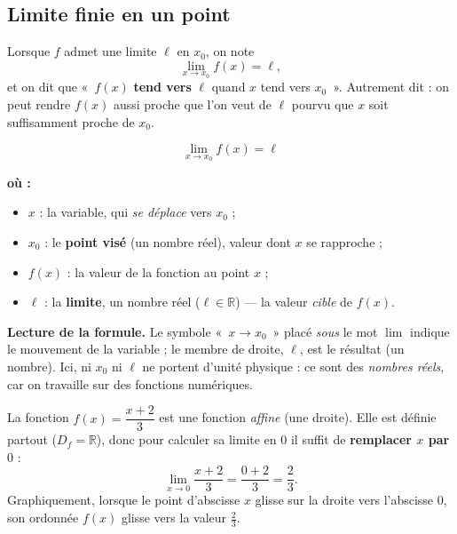\documentclass[11pt,a4paper]{article}
\newenvironment{ou}{%
  \par\smallskip\noindent\textbf{où :}\nopagebreak
  \begin{itemize}[leftmargin=1.8em,topsep=2pt,itemsep=1.5pt,parsep=0pt]}%
  {\end{itemize}}
\newcommand{\R}{\mathbb{R}}
\begin{document}
\subsection{Limite finie en un point}

\begin{definition}
Lorsque $f$ admet une limite $\ell$ en $x_0$, on note
\[ \lim_{x\to x_0} f(x)=\ell, \]
et on dit que «~$f(x)$ \textbf{tend vers} $\ell$ quand $x$ tend vers $x_0$~».
Autrement dit : on peut rendre $f(x)$ aussi proche que l'on veut de $\ell$ pourvu que $x$ soit
suffisamment proche de $x_0$.
\end{definition}

\begin{formule}
\[ \boxed{\ \lim_{x\to x_0} f(x)=\ell\ } \]
\begin{ou}
  \item $x$ : la variable, qui \emph{se déplace} vers $x_0$ ;
  \item $x_0$ : le \textbf{point visé} (un nombre réel), valeur dont $x$ se rapproche ;
  \item $f(x)$ : la valeur de la fonction au point $x$ ;
  \item $\ell$ : la \textbf{limite}, un nombre réel ($\ell\in\R$) — la valeur \emph{cible} de $f(x)$.
\end{ou}
\end{formule}

\noindent\textbf{Lecture de la formule.} Le symbole «~$x\to x_0$~» placé \emph{sous} le mot $\lim$
indique le mouvement de la variable ; le membre de droite, $\ell$, est le résultat (un nombre).
Ici, ni $x_0$ ni $\ell$ ne portent d'unité physique : ce sont des \emph{nombres réels}, car on
travaille sur des fonctions numériques.

\begin{exemple}[limite finie $\displaystyle\lim_{x\to 0}\frac{x+2}{3}=\frac{2}{3}$]
La fonction $f(x)=\dfrac{x+2}{3}$ est une fonction \emph{affine} (une droite). Elle est définie
partout ($D_f=\R$), donc pour calculer sa limite en $0$ il suffit de \textbf{remplacer $x$ par $0$} :
\[ \lim_{x\to 0}\frac{x+2}{3}=\frac{0+2}{3}=\frac{2}{3}. \]
Graphiquement, lorsque le point d'abscisse $x$ glisse sur la droite vers l'abscisse $0$, son
ordonnée $f(x)$ glisse vers la valeur $\tfrac{2}{3}$.
\end{exemple}
\end{document}
